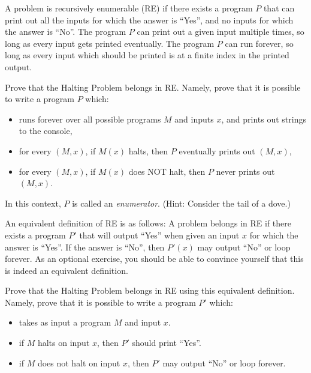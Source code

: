 \documentclass[11pt]{article}
\begin{document}
\begin{Parts}

\Part A problem is recursively enumerable (\textsf{RE}) if there exists a program $P$ that can print out all the inputs for which the answer is ``Yes'', and no inputs for which the answer is ``No''.
The program $P$ can print out a given input multiple times, so long as every input gets printed eventually. The program $P$ can run forever, so long as every input which should be printed is at a finite index in the printed output.

Prove that the Halting Problem belongs in \textsf{RE}. Namely, prove that it is possible to write a program $P$ which:
  \begin{itemize}
  \item runs forever over all possible programs $M$ and inputs $x$, and prints out strings to the console,
  \item for every $(M, x)$, if $M(x)$ halts, then $P$ eventually prints out $(M, x)$,
  \item for every $(M, x)$, if $M(x)$ does NOT halt, then $P$ never prints out $(M, x)$.
  \end{itemize}

In this context, $P$ is called an \emph{enumerator}.
(Hint: Consider the tail of a dove.)
\normalfont

\begin{solution}
  
\end{solution}

\Part An equivalent definition of \textsf{RE} is as follows: A problem belongs in \textsf{RE} if there exists a program $P'$ that will output ``Yes'' when given an input $x$ for which the answer is ``Yes''. If the answer is ``No'', then $P'(x)$ may output ``No'' or loop forever. As an optional exercise, you should be able to convince yourself that this is indeed an equivalent definition. 

Prove that the Halting Problem belongs in \textsf{RE} using this equivalent definition. Namely, prove that it is possible to write a program $P'$ which:
  \begin{itemize}
  \item takes as input a program $M$ and input $x$.
  \item if $M$ halts on input $x$, then $P'$ should print ``Yes''.
  \item if $M$ does not halt on input $x$, then $P'$ may output ``No'' or loop forever.
  \end{itemize}


\end{Parts}
\end{document}
